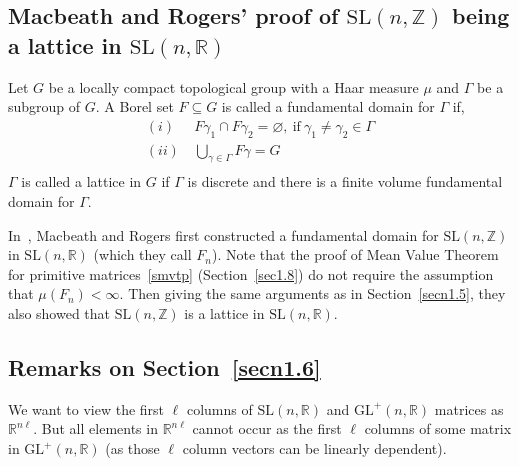 \documentclass[11pt]{article}
\theoremstyle{definition}
\begin{document}
\subsection{Macbeath and Rogers' proof of $\mathrm{SL}(n, \mathbb{Z})$ being a lattice in $\mathrm{SL}(n, \mathbb{R})$}
Let $G$ be a locally compact topological group with a Haar measure $\mu$ and $\Gamma$ be a subgroup of $G$.
A Borel set $F \subseteq G$ is called a fundamental domain for $\Gamma$ if,
\begin{align*}\label{eq1.18}
    (i)& \ F \gamma _1 \cap F \gamma _2 = \varnothing, \ \text{if} \ \gamma _1 \neq \gamma _2 \in \Gamma \\
    (ii)& \ \bigcup_{\gamma \in \Gamma } F \gamma = G \\
\end{align*}
$\Gamma$ is called a lattice in $G$ if $\Gamma$ is discrete and there is a finite volume fundamental domain for $\Gamma$.

In~\cite{macbeathrogers58}, Macbeath and Rogers first constructed a fundamental domain for $\mathrm{SL}(n,\mathbb{Z})$ in $\mathrm{SL}(n,\mathbb{R})$ (which they call $F_n$).
Note that the proof of Mean Value Theorem for primitive matrices~\ref{smvtp} (Section~\ref{sec1.8}) do not require the assumption that $ \mu (F_n) < \infty$.
Then giving the same arguments as in Section~\ref{secn1.5}, they also showed that $\mathrm{SL}(n,\mathbb{Z})$ is a lattice in $\mathrm{SL}(n,\mathbb{R})$.

\subsection{Remarks on Section~\ref{secn1.6}}\label{1.9.2}
We want to view the first $\ell$ columns of $\mathrm{SL}(n,\mathbb{R})$ and $\mathrm{GL}^+(n,\mathbb{R})$ matrices as $\mathbb{R}^{n \ell }$.
But all elements in $\mathbb{R}^{n \ell }$ cannot occur as the first $\ell$ columns of some matrix in $\mathrm{GL}^+(n,\mathbb{R})$ (as those $\ell$ column vectors can be linearly dependent).
\end{document}

